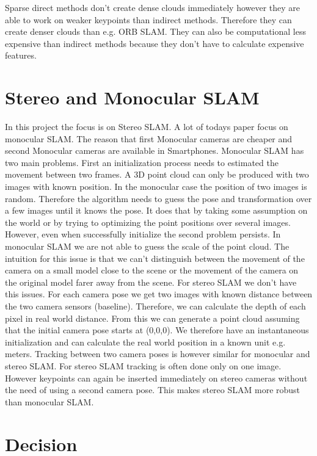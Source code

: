 \documentclass[11pt,a4paper,titlepage,oneside]{report}
\begin{document}
Sparse direct methods don't create dense clouds immediately however they are able to work on weaker keypoints than indirect methods. Therefore they can create denser clouds than e.g. ORB SLAM. They can also be computational less expensive than indirect methods because they don't have to calculate expensive features.

\section{Stereo and Monocular SLAM}

In this project the focus is on Stereo SLAM. A lot of todays paper focus on monocular SLAM. The reason that first Monocular cameras are cheaper and second Monocular cameras are available in Smartphones. Monocular SLAM has two main problems. First an initialization process needs to estimated the movement between two frames. A 3D point cloud can only be produced with two images with known position. In the monocular case the position of two images is random. Therefore the algorithm needs to guess the pose and transformation over a few images until it knows the pose. It does that by taking some assumption on the world or by trying to optimizing the point positions over several images. However, even when successfully initialize the second problem persists. In monocular SLAM we are not able to guess the scale of the point cloud. The intuition for this issue is that we can't distinguish between the movement of the camera on a small model close to the scene or the movement of the camera on the original model farer away from the scene. For stereo SLAM we don't have this issues. For each camera pose we get two images with known distance between the two camera sensors (baseline). Therefore, we can calculate the depth of each pixel in real world distance. From this we can generate a point cloud assuming that the initial camera pose starts at (0,0,0). We therefore have an instantaneous initialization and can calculate the real world position in a known unit e.g. meters. Tracking between two camera poses is however similar for monocular and stereo SLAM. For stereo SLAM tracking is often done only on one image. However keypoints can again be inserted immediately on stereo cameras without the need of using a second camera pose. This makes stereo SLAM more robust than monocular SLAM.

\section{Decision}
\end{document}
